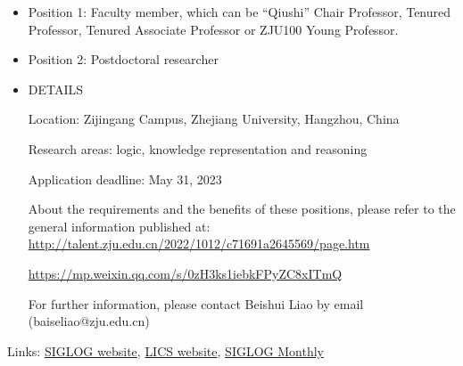 \documentclass[prodmode,acmtecs]{acmsmall} %
\begin{document}
\begin{itemize}\item  Position 1:  Faculty member, which can be “Qiushi” Chair Professor, Tenured Professor, Tenured Associate Professor or ZJU100 Young Professor.    
 
\item  Position 2: Postdoctoral researcher 
 
\item  DETAILS 
 
  Location: Zijingang Campus, Zhejiang University, Hangzhou, China  
 
  Research areas: logic, knowledge representation and reasoning 
 
Application deadline: May 31, 2023 
 
  About the requirements and the benefits of these positions, please refer to the general information published at: \href{http://talent.zju.edu.cn/2022/1012/c71691a2645569/page.htm}{http://talent.zju.edu.cn/2022/1012/c71691a2645569/page.htm} 
 
  \href{https://mp.weixin.qq.com/s/0zH3ks1iebkFPyZC8xITmQ}{https://mp.weixin.qq.com/s/0zH3ks1iebkFPyZC8xITmQ} 
 
  For further information, please contact Beishui Liao  by email (baiseliao@zju.edu.cn) 
 
\end{itemize}


\bigskip Links: \href{http://siglog.org/}{SIGLOG website}, \href{https://lics.siglog.org}{LICS website}, \href{https://lics.siglog.org/newsletters/}{SIGLOG Monthly}
\end{document}
